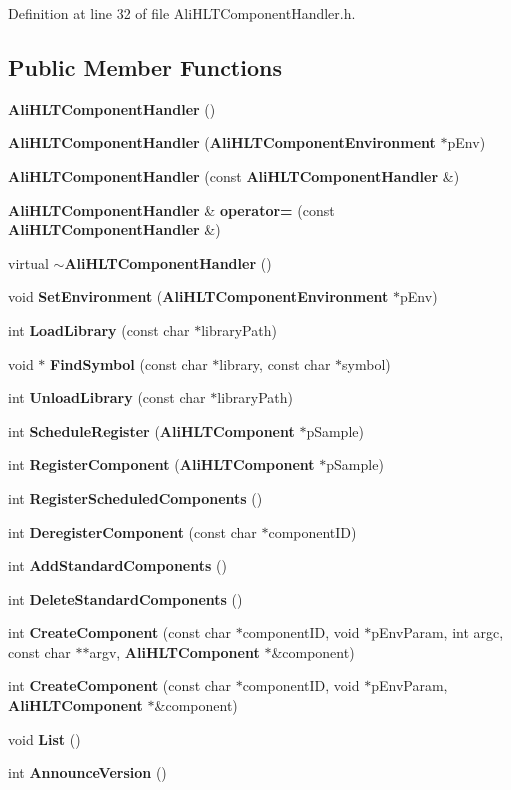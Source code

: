 Definition at line 32 of file Ali\-HLTComponent\-Handler.h.\subsection*{Public Member Functions}
\begin{CompactItemize}
\item 
{\bf Ali\-HLTComponent\-Handler} ()
\item 
{\bf Ali\-HLTComponent\-Handler} ({\bf Ali\-HLTComponent\-Environment} $\ast$p\-Env)
\item 
{\bf Ali\-HLTComponent\-Handler} (const {\bf Ali\-HLTComponent\-Handler} \&)
\item 
{\bf Ali\-HLTComponent\-Handler} \& {\bf operator=} (const {\bf Ali\-HLTComponent\-Handler} \&)
\item 
virtual {\bf $\sim$Ali\-HLTComponent\-Handler} ()
\item 
void {\bf Set\-Environment} ({\bf Ali\-HLTComponent\-Environment} $\ast$p\-Env)
\item 
int {\bf Load\-Library} (const char $\ast$library\-Path)
\item 
void $\ast$ {\bf Find\-Symbol} (const char $\ast$library, const char $\ast$symbol)
\item 
int {\bf Unload\-Library} (const char $\ast$library\-Path)
\item 
int {\bf Schedule\-Register} ({\bf Ali\-HLTComponent} $\ast$p\-Sample)
\item 
int {\bf Register\-Component} ({\bf Ali\-HLTComponent} $\ast$p\-Sample)
\item 
int {\bf Register\-Scheduled\-Components} ()
\item 
int {\bf Deregister\-Component} (const char $\ast$component\-ID)
\item 
int {\bf Add\-Standard\-Components} ()
\item 
int {\bf Delete\-Standard\-Components} ()
\item 
int {\bf Create\-Component} (const char $\ast$component\-ID, void $\ast$p\-Env\-Param, int argc, const char $\ast$$\ast$argv, {\bf Ali\-HLTComponent} $\ast$\&component)
\item 
int {\bf Create\-Component} (const char $\ast$component\-ID, void $\ast$p\-Env\-Param, {\bf Ali\-HLTComponent} $\ast$\&component)
\item 
void {\bf List} ()
\item 
int {\bf Announce\-Version} ()
\end{CompactItemize}

